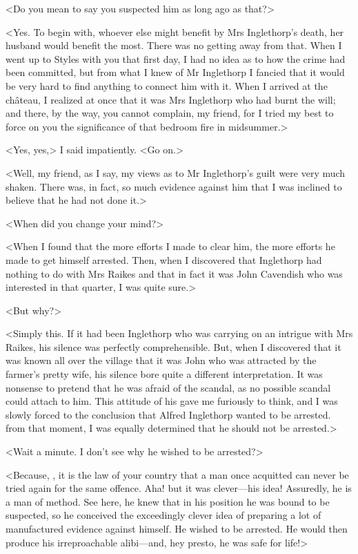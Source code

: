  <Do you mean to say you suspected him as long ago as that?> 

 <Yes. To begin with, whoever else might benefit by Mrs Inglethorp's death, her husband would benefit the most. There was no getting away from that. When I went up to Styles with you that first day, I had no idea as to how the crime had been committed, but from what I knew of Mr Inglethorp I fancied that it would be very hard to find anything to connect him with it. When I arrived at the château, I realized at once that it was Mrs Inglethorp who had burnt the will; and there, by the way, you cannot complain, my friend, for I tried my best to force on you the significance of that bedroom fire in midsummer.> 

 <Yes, yes,> I said impatiently. <Go on.> 

 <Well, my friend, as I say, my views as to Mr Inglethorp's guilt were very much shaken. There was, in fact, so much evidence against him that I was inclined to believe that he had not done it.> 

 <When did you change your mind?> 

 <When I found that the more efforts I made to clear him, the more efforts he made to get himself arrested. Then, when I discovered that Inglethorp had nothing to do with Mrs Raikes and that in fact it was John Cavendish who was interested in that quarter, I was quite sure.> 

 <But why?> 

 <Simply this. If it had been Inglethorp who was carrying on an intrigue with Mrs Raikes, his silence was perfectly comprehensible. But, when I discovered that it was known all over the village that it was John who was attracted by the farmer's pretty wife, his silence bore quite a different interpretation. It was nonsense to pretend that he was afraid of the scandal, as no possible scandal could attach to him. This attitude of his gave me furiously to think, and I was slowly forced to the conclusion that Alfred Inglethorp wanted to be arrested.  from that moment, I was equally determined that he should not be arrested.> 

 <Wait a minute. I don't see why he wished to be arrested?> 

 <Because, , it is the law of your country that a man once acquitted can never be tried again for the same offence. Aha! but it was clever—his idea! Assuredly, he is a man of method. See here, he knew that in his position he was bound to be suspected, so he conceived the exceedingly clever idea of preparing a lot of manufactured evidence against himself. He wished to be arrested. He would then produce his irreproachable alibi—and, hey presto, he was safe for life!> 


